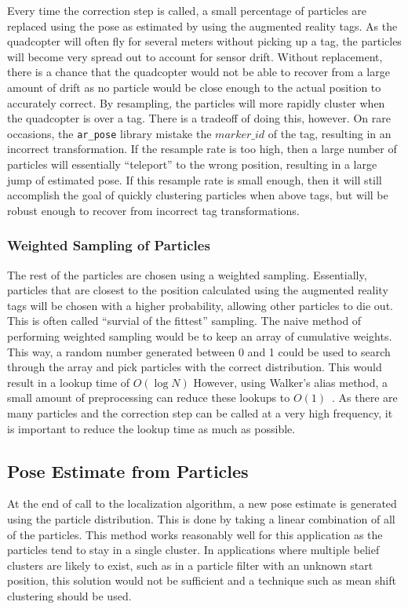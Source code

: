 			Every time the correction step is called, a small percentage of particles are replaced using the pose as estimated by using the augmented reality tags. As the quadcopter will often fly for several meters without picking up a tag, the particles will become very spread out to account for sensor drift. Without replacement, there is a chance that the quadcopter would not be able to recover from a large amount of drift as no particle would be close enough to the actual position to accurately correct. By resampling, the particles will more rapidly cluster when the quadcopter is over a tag. There is a tradeoff of doing this, however. On rare occasions, the \texttt{ar\_pose} library mistake the $marker\_id$ of the tag, resulting in an incorrect transformation. If the resample rate is too high, then a large number of particles will essentially ``teleport'' to the wrong position, resulting in a large jump of estimated pose. If this resample rate is small enough, then it will still accomplish the goal of quickly clustering particles when above tags, but will be robust enough to recover from incorrect tag transformations.


		\subsubsection{Weighted Sampling of Particles}

			The rest of the particles are chosen using a weighted sampling. Essentially, particles that are closest to the position calculated using the augmented reality tags will be chosen with a higher probability, allowing other particles to die out. This is often called ``survial of the fittest'' sampling. The naive method of performing weighted sampling would be to keep an array of cumulative weights. This way, a random number generated between 0 and 1 could be used to search through the array and pick particles with the correct distribution. This would result in a lookup time of $O(\log{N})$ However, using Walker's alias method, a small amount of preprocessing can reduce these lookups to $O(1)$~\cite{Walker}. As there are many particles and the correction step can be called at a very high frequency, it is important to reduce the lookup time as much as possible.

	\subsection{Pose Estimate from Particles}
		At the end of call to the localization algorithm, a new pose estimate is generated using the particle distribution. This is done by taking a linear combination of all of the particles. This method works reasonably well for this application as the particles tend to stay in a single cluster. In applications where multiple belief clusters are likely to exist, such as in a particle filter with an unknown start position, this solution would not be sufficient and a technique such as mean shift clustering should be used. 


